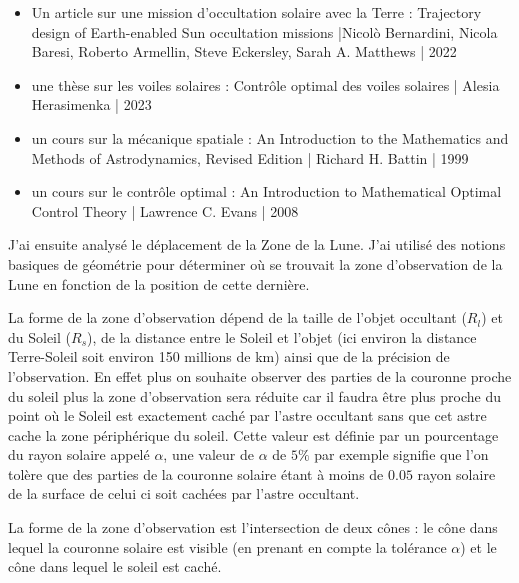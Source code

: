 \documentclass[11pt]{article} %
\begin{document}
		\begin{itemize}
			\item Un article sur une mission d'occultation solaire avec la Terre : Trajectory design of Earth-enabled Sun occultation missions |Nicolò Bernardini, Nicola Baresi, Roberto Armellin, Steve Eckersley, Sarah A. Matthews | 2022
			\item une thèse sur les voiles solaires : Contrôle optimal des voiles solaires | Alesia Herasimenka | 2023
			\item un cours sur la mécanique spatiale : An Introduction to the 
			Mathematics and Methods of 
			Astrodynamics, Revised Edition | Richard H. Battin | 1999 
			\item un cours sur le contrôle optimal : An Introduction to Mathematical
			Optimal Control Theory | Lawrence C. Evans | 2008
		\end{itemize}
		
		
		J'ai ensuite analysé le déplacement de la \gls{Zone} de la Lune. J'ai utilisé des notions basiques de géométrie pour déterminer où se trouvait la zone d'observation de la Lune en fonction de la position de cette dernière.
		
		La forme de la zone d'observation dépend de la taille de l'objet occultant ($R_l$) et du Soleil ($R_s$), de la distance entre le Soleil et l'objet (ici environ la distance Terre-Soleil soit environ 150 millions de km) ainsi que de la précision de l'observation. En effet plus on souhaite observer des parties de la couronne proche du soleil plus la zone d'observation sera réduite car il faudra être plus proche du point où le Soleil est exactement caché par l'astre occultant sans que cet astre cache la zone périphérique du soleil. Cette valeur est définie par un pourcentage du rayon solaire appelé $\alpha$, une valeur de $\alpha$ de $5\%$ par exemple signifie que l'on tolère que des parties de la couronne solaire étant à moins de $0.05$ rayon solaire de la surface de celui ci soit cachées par l'astre occultant.
		
		La forme de la zone d'observation est l'intersection de deux cônes : le cône dans lequel la couronne solaire est visible (en prenant en compte la tolérance $\alpha$) et le cône dans lequel le soleil est caché.
		
\end{document}
